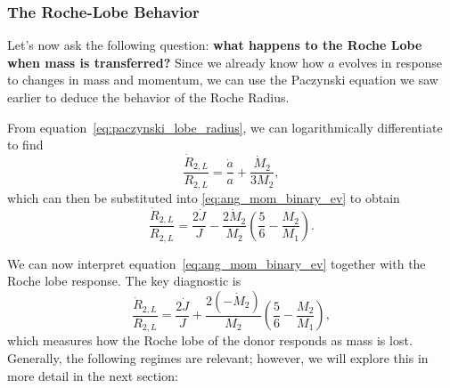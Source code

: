 \subsubsection{The Roche-Lobe Behavior}
Let's now ask the following question: \textbf{what happens to the Roche Lobe when mass is transferred?} Since we already know how $a$ evolves in response to changes in mass and momentum, we can use the Paczynski equation we saw earlier to deduce the behavior of the Roche Radius.
\par
From equation~\eqref{eq:paczynski_lobe_radius}, we can logarithmically differentiate to find
\[
\boxed{
\frac{\dot{R}_{2,L}}{R_{2,L}} = \frac{\dot{a}}{a} + \frac{\dot{M}_2}{3M_2},
}
\]
which can then be substituted into \eqref{eq:ang_mom_binary_ev} to obtain
\begin{equation}
\label{eq:roche_lobe_stability}
\boxed{
    \frac{\dot{R}_{2,L}}{R_{2,L}} = \frac{2\dot{J}}{J} - \frac{2\dot{M}_2}{M_2}\left(\frac{5}{6}-\frac{M_2}{M_1}\right).
}
\end{equation}
\par
We can now interpret equation~\eqref{eq:ang_mom_binary_ev} together with the Roche lobe response.  The key diagnostic is
\[
\frac{\dot{R}_{2,L}}{R_{2,L}} = \frac{2\dot{J}}{J}
   + \frac{2(-\dot{M}_2)}{M_2}\!\left(\frac{5}{6} - \frac{M_2}{M_1}\right),
\]
which measures how the Roche lobe of the donor responds as mass is lost. Generally, the following regimes are relevant; however, we will explore this in more detail in the next section:


